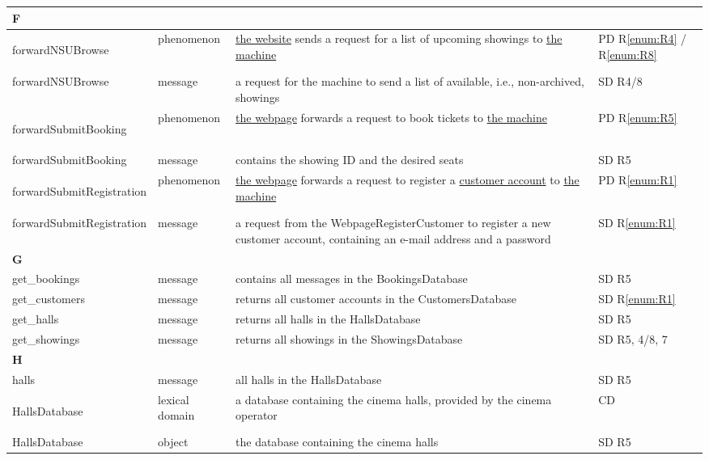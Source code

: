 \documentclass[a4paper,10pt,titlepage,bibtotoc,bibtotocnumbered]{scrreprt}
\begin{document}
\begin{longtable}{|l|p{3cm}|p{5cm}|l|}
\hline
\multicolumn{4}{|l|}{\textbf{F}}\\
\hline
\hline
\hypertarget{glossary:forwardNSUBrowse}{forwardNSUBrowse} & phenomenon & \hyperlink{glossary:WebPageNonStaffUserBrowse}{the website} sends a request for a list of upcoming showings to \hyperlink{glossary:UDEK-NonStaffUserBrowse}{the machine} & PD R\ref{enum:R4} / R\ref{enum:R8}\\
\hline
forwardNSUBrowse & message & a request for the machine to send a list of available, i.e., non-archived, showings & SD R4/8\\
\hline
\hypertarget{glossary:forwardSubmitBooking}{forwardSubmitBooking} & phenomenon & \hyperlink{glossary:WebpageBookTickets}{the webpage} forwards a request to book tickets to \hyperlink{glossary:UDEKino}{the machine} & PD R\ref{enum:R5}\\
\hline
forwardSubmitBooking & message & contains the showing ID and the desired seats & SD R5\\
\hline
\hypertarget{glossary:forwardSubmitRegistration}{forwardSubmitRegistration} & phenomenon & \hyperlink{glossary:WebpageRegisterCustomer}{the webpage} forwards a request to register a \hyperlink{glossary:Customer}{customer account} to \hyperlink{glossary:UDEKino}{the machine} & PD R\ref{enum:R1}\\
\hline
forwardSubmitRegistration & message & a request from the WebpageRegisterCustomer to register a new customer account, containing an e-mail address and a password & SD R\ref{enum:R1}\\
\hline
\multicolumn{4}{|l|}{\textbf{G}}\\
\hline
get\_bookings & message & contains all messages in the BookingsDatabase & SD R5\\
\hline
get\_customers & message & returns all customer accounts in the CustomersDatabase & SD R\ref{enum:R1}\\
\hline
get\_halls & message & returns all halls in the HallsDatabase & SD R5\\
\hline
get\_showings & message & returns all showings in the ShowingsDatabase & SD R5, 4/8, 7\\
\hline
\multicolumn{4}{|l|}{\textbf{H}}\\
\hline
halls & message & all halls in the HallsDatabase & SD R5\\
\hline
\hypertarget{glossary:HallsDatabase}{HallsDatabase} & lexical domain & a database containing the cinema halls, provided by the cinema operator & CD\\
\hline
HallsDatabase & object & the database containing the cinema halls & SD R5\\

\end{longtable}
\end{document}
